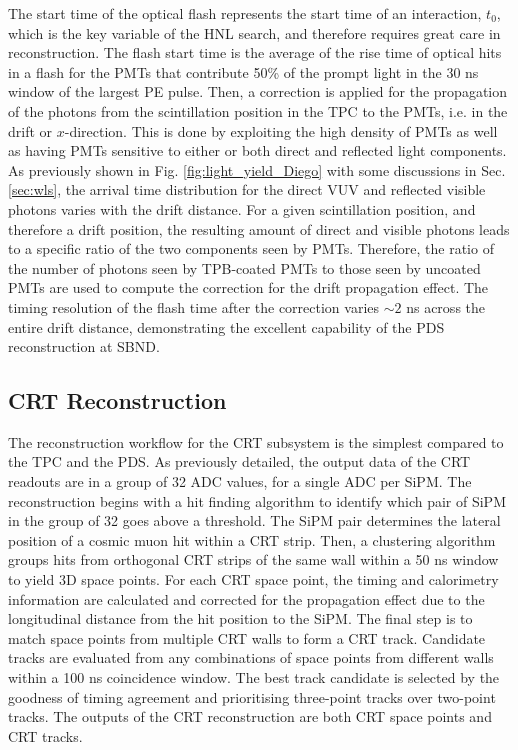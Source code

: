 The start time of the optical flash represents the start time of an interaction, $t_0$, which is the key
 variable of the HNL search, and therefore requires great care in reconstruction.
The flash start time is the average of the rise time of optical hits in a flash for the PMTs that contribute 50\% of the prompt light in the 30 ns window of the largest PE pulse.                              
Then, a correction is applied for the propagation of the photons from the scintillation position in the TPC to the PMTs, i.e. in the drift or $x$-direction.                                                    
This is done by exploiting the high density of PMTs as well as having PMTs sensitive to either or both 
direct and reflected light components.
As previously shown in Fig. \ref{fig:light_yield_Diego} with some discussions in Sec. \ref{sec:wls}, the
 arrival time distribution for the direct VUV and reflected visible photons varies with the drift distance.
For a given scintillation position, and therefore a drift position, the resulting amount of direct and visible photons leads to a specific ratio of the two components seen by PMTs.                     
Therefore, the ratio of the number of photons seen by TPB-coated PMTs to those seen by uncoated 
PMTs are used to compute the correction for the drift propagation effect.
The timing resolution of the flash time after the correction varies $\sim 2$ ns across the entire drift distance, demonstrating the excellent capability of the PDS reconstruction at SBND.

\subsection{CRT Reconstruction}

The reconstruction workflow for the CRT subsystem is the simplest compared to the TPC and the PDS.                                                                                                    
As previously detailed, the output data of the CRT readouts are in a group of 32 ADC values, for a single ADC per SiPM.
The reconstruction begins with a hit finding algorithm to identify which pair of SiPM in the group of 32 goes above a threshold.
The SiPM pair determines the lateral position of a cosmic muon hit within a CRT strip.
Then, a clustering algorithm groups hits from orthogonal CRT strips of the same wall within a 50 ns window to yield 3D space points.
For each CRT space point, the timing and calorimetry information are calculated and corrected for the propagation effect due to the longitudinal distance from the hit position to the SiPM.
The final step is to match space points from multiple CRT walls to form a CRT track.
Candidate tracks are evaluated from any combinations of space points from different walls within a 100 ns coincidence window.
The best track candidate is selected by the goodness of timing agreement and prioritising three-point tracks over two-point tracks. 
The outputs of the CRT reconstruction are both CRT space points and CRT tracks. 

